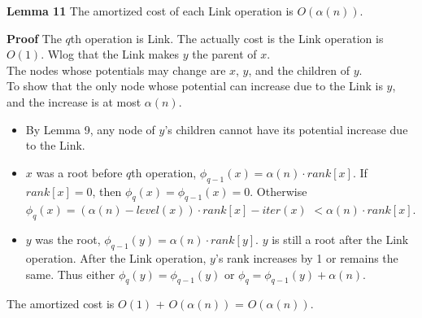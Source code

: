 \documentclass{beamer}
\begin{document}
\begin{frame}{}

{\bf Lemma 11} The amortized cost of each {\sc Link} operation is $O(\alpha(n))$. 

{\bf Proof} The $q$th operation is {\sc Link}. The actually cost is the {\sc Link}
operation is $O(1)$. Wlog that the {\sc Link} makes $y$ the parent of $x$. \\
The nodes whose potentials may change are $x$, $y$, and the children of $y$. \\
To show that the only node whose potential can increase due to the {\sc Link}
is $y$, and the increase is at most $\alpha(n)$. \\
\begin{itemize}
\item By Lemma 9, any node of $y$'s children cannot have its potential increase due to the {\sc Link.}
\item $x$ was a root before $q$th operation, $\phi_{q-1}(x)=\alpha(n)\cdot rank[x]$. If $rank[x]=0$,
then $\phi_q(x)=\phi_{q-1}(x)=0$. Otherwise $\phi_q(x)=(\alpha(n)-level(x))\cdot rank[x]-iter(x)$
$<\alpha(n)\cdot rank[x]$.
\item $y$ was the root, $\phi_{q-1}(y)=\alpha(n)\cdot rank[y]$. $y$ is still a root after the {\sc Link}
operation. After the {\sc Link} operation, $y$'s rank increases by 1 or remains the same. Thus
either $\phi_q(y)=\phi_{q-1}(y)$ or $\phi_q=\phi_{q-1}(y)+\alpha(n)$. 
\end{itemize}
The amortized cost is $O(1)$ + $O(\alpha(n))$ = $O(\alpha(n))$. 
\end{frame}
\end{document}
